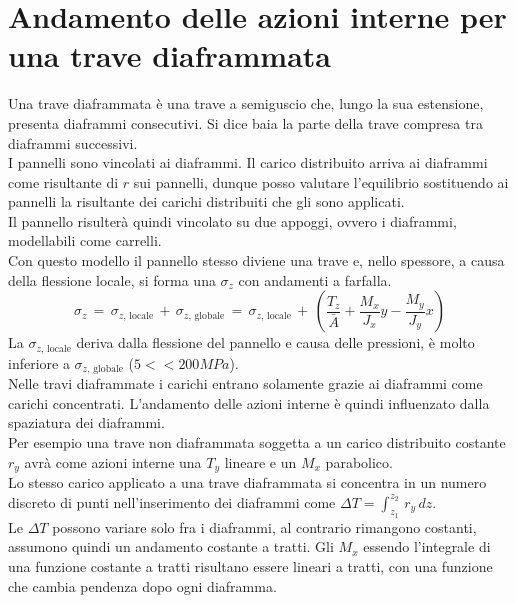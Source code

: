 \section{Andamento delle azioni interne per una trave diaframmata}

Una trave diaframmata è una trave a semiguscio che, lungo la sua estensione, presenta diaframmi consecutivi. Si dice baia la parte della trave compresa tra diaframmi successivi.\\


I pannelli sono vincolati ai diaframmi. Il carico distribuito arriva ai diaframmi come risultante di $r$ sui pannelli, dunque posso valutare l'equilibrio sostituendo ai pannelli la risultante dei carichi distribuiti che gli sono applicati.\\
Il pannello risulterà quindi vincolato su due appoggi, ovvero i diaframmi, modellabili come carrelli.\\
Con questo modello il pannello stesso diviene una trave e, nello spessore, a causa della flessione locale, si forma una $\sigma_z$ con andamenti a farfalla.
\begin{equation*}
    \sigma_z\,=\, \sigma_{z,\,\mathrm{locale}}\,+\, \sigma_{z,\,\mathrm{globale}}
    \,=\, \sigma_{z,\,\mathrm{locale}}\,+\, \left(\frac{T_z}{\bar{A}}+\frac{M_x}{J_x}y-\frac{M_y}{J_y}x\right)
\end{equation*}
La $\sigma_{z,\,\mathrm{locale}}$ deriva dalla flessione del pannello e causa delle pressioni, è molto inferiore a $\sigma_{z,\,\mathrm{globale}}$
($5<<200MPa$).\\

Nelle travi diaframmate i carichi entrano solamente grazie ai diaframmi come carichi concentrati. L'andamento delle azioni interne è quindi influenzato dalla spaziatura dei diaframmi.\\


Per esempio una trave non diaframmata soggetta a un carico distribuito costante $r_y$ avrà come azioni interne una $T_y$ lineare e un $M_x$ parabolico.\\
Lo stesso carico applicato a una trave diaframmata si concentra in un numero discreto di punti nell'inserimento dei diaframmi come $\Delta T = \int_{z_1}^{z_2}\,r_y\,dz$.\\
Le $   \Delta T$ possono variare solo fra i diaframmi, al contrario rimangono costanti, assumono quindi un andamento costante a tratti.
Gli $M_x$ essendo l'integrale di una funzione costante a tratti risultano essere lineari a tratti, con una funzione che cambia pendenza dopo ogni diaframma.

